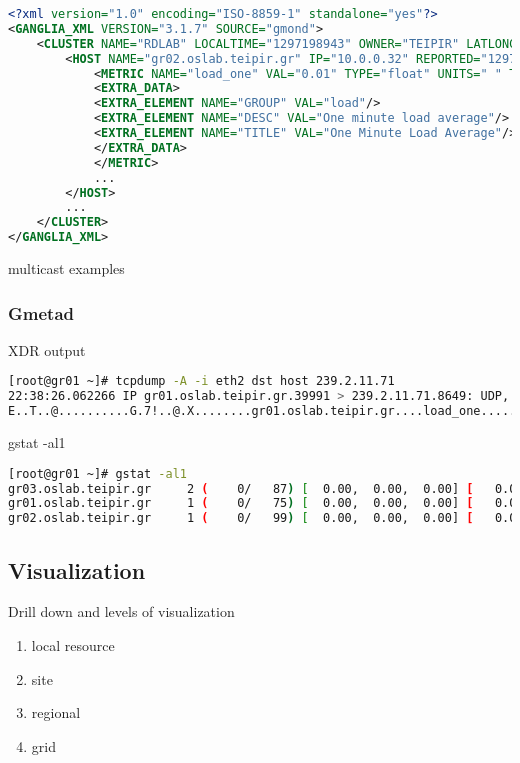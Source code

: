 \begin{lstlisting}[language=XML,caption=Gmond XML cluster report]
<?xml version="1.0" encoding="ISO-8859-1" standalone="yes"?>
<GANGLIA_XML VERSION="3.1.7" SOURCE="gmond">
	<CLUSTER NAME="RDLAB" LOCALTIME="1297198943" OWNER="TEIPIR" LATLONG="unspecified" URL="unspecified">
		<HOST NAME="gr02.oslab.teipir.gr" IP="10.0.0.32" REPORTED="1297198934" TN="8" TMAX="20" DMAX="0" LOCATION="unspecified" GMOND_STARTED="1296569542">
			<METRIC NAME="load_one" VAL="0.01" TYPE="float" UNITS=" " TN="50" TMAX="70" DMAX="0" SLOPE="both">
			<EXTRA_DATA>
			<EXTRA_ELEMENT NAME="GROUP" VAL="load"/>
			<EXTRA_ELEMENT NAME="DESC" VAL="One minute load average"/>
			<EXTRA_ELEMENT NAME="TITLE" VAL="One Minute Load Average"/>
			</EXTRA_DATA>
			</METRIC>
			...
		</HOST>
		...
	</CLUSTER>
</GANGLIA_XML>
\end{lstlisting}
multicast examples
\newpage

\subsubsection{Gmetad}
\newpage

XDR output

\begin{lstlisting}[language=bash,caption=XDR sample]
[root@gr01 ~]# tcpdump -A -i eth2 dst host 239.2.11.71
22:38:26.062266 IP gr01.oslab.teipir.gr.39991 > 239.2.11.71.8649: UDP, length 56
E..T..@..........G.7!..@.X........gr01.oslab.teipir.gr....load_one........%.2f..
\end{lstlisting}

gstat -al1

\begin{lstlisting}[language=bash,caption=Gstat output]
[root@gr01 ~]# gstat -al1
gr03.oslab.teipir.gr     2 (    0/   87) [  0.00,  0.00,  0.00] [   0.0,   0.0,   0.0,  99.9,   0.1] OFF
gr01.oslab.teipir.gr     1 (    0/   75) [  0.00,  0.00,  0.00] [   0.0,   0.0,   0.0,  99.9,   0.0] OFF
gr02.oslab.teipir.gr     1 (    0/   99) [  0.00,  0.00,  0.00] [   0.0,   0.0,   0.1,  99.9,   0.0] OFF
\end{lstlisting}
\newpage

\subsection{Visualization}
Drill down and levels of visualization
\begin{enumerate}
  \item local resource
  \item site
  \item regional
  \item grid
\end{enumerate}

